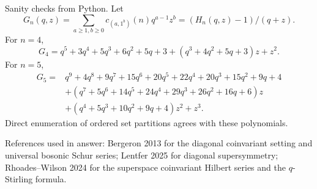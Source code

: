 \documentclass[12pt]{article}
\begin{document}
Sanity checks from Python.  Let
\[
G_n(q,z)=\sum_{a\ge1,b\ge0}c_{(a,1^b)}(n)q^{a-1}z^b=(H_n(q,z)-1)/(q+z).
\]
For \(n=4\),
\[
G_4=q^5+3q^4+5q^3+6q^2+5q+3
+(q^3+4q^2+5q+3)z+z^2.
\]
For \(n=5\),
\[
\begin{aligned}
G_5={}&q^9+4q^8+9q^7+15q^6+20q^5+22q^4+20q^3+15q^2+9q+4\\
&+(q^7+5q^6+14q^5+24q^4+29q^3+26q^2+16q+6)z\\
&+(q^4+5q^3+10q^2+9q+4)z^2+z^3.
\end{aligned}
\]
Direct enumeration of ordered set partitions agrees with these polynomials.

References used in answer: Bergeron 2013 for the diagonal coinvariant setting
and universal bosonic Schur series; Lentfer 2025 for diagonal supersymmetry;
Rhoades--Wilson 2024 for the superspace coinvariant Hilbert series and the
\(q\)-Stirling formula.
\end{document}
